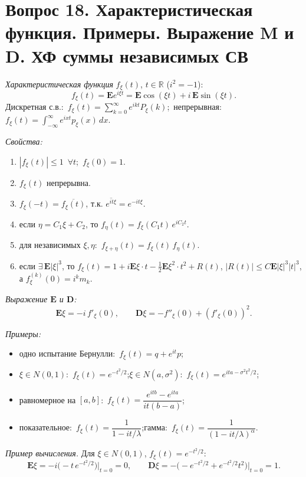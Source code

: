 \section*{Вопрос 18. Характеристическая функция. Примеры. Выражение M и D. ХФ суммы независимых СВ}

\textit{Характеристическая функция} $f_\xi(t)$, $t\in\mathbb{R}$ ($i^2=-1$):
\[ f_\xi(t)=\mathbf{E}e^{i\xi t}=\mathbf{E}\cos(\xi t)+i\,\mathbf{E}\sin(\xi t). \]
Дискретная с.в.:\ $f_\xi(t)=\sum_{k=0}^{\infty}e^{ikt}P_\xi(k)$;\ непрерывная:\ $f_\xi(t)=\int_{-\infty}^{\infty}e^{ixt}p_\xi(x)\,dx$.

\textit{Свойства:}
\begin{enumerate}
  \item $|f_\xi(t)|\le1$\ $\forall t$;\ $f_\xi(0)=1$.
  \item $f_\xi(t)$ непрерывна.
  \item $f_\xi(-t)=\overline{f_\xi(t)}$, т.к. $\overline{e^{it\xi}}=e^{-it\xi}$.
  \item если $\eta=C_1\xi+C_2$, то $f_\eta(t)=f_\xi(C_1 t)\,e^{iC_2 t}$.
  \item для независимых $\xi,\eta$:\ $f_{\xi+\eta}(t)=f_\xi(t)\,f_\eta(t)$.
  \item если $\exists\,\mathbf{E}|\xi|^3$, то $f_\xi(t)=1+i\mathbf{E}\xi\cdot t-\tfrac12\mathbf{E}\xi^2\cdot t^2+R(t)$, $|R(t)|\le C\mathbf{E}|\xi|^3|t|^3$, а $f_\xi^{(k)}(0)=i^k m_k$.
\end{enumerate}

\textit{Выражение $\mathbf{E}$ и $\mathbf{D}$:}
\[ \mathbf{E}\xi=-i\,f'_\xi(0),\qquad \mathbf{D}\xi=-f''_\xi(0)+(f'_\xi(0))^2. \]

\textit{Примеры:}
\begin{itemize}
  \item одно испытание Бернулли:\ $f_\xi(t)=q+e^{it}p$;
  \item $\xi\in N(0,1)$:\ $f_\xi(t)=e^{-t^2/2}$;\quad $\xi\in N(a,\sigma^2)$:\ $f_\xi(t)=e^{ita-\sigma^2 t^2/2}$;
  \item равномерное на $[a,b]$:\ $f_\xi(t)=\dfrac{e^{itb}-e^{ita}}{it(b-a)}$;
  \item показательное:\ $f_\xi(t)=\dfrac{1}{1-it/\lambda}$;\quad гамма:\ $f_\xi(t)=\dfrac{1}{(1-it/\lambda)^\alpha}$.
\end{itemize}

\textit{Пример вычисления.} Для $\xi\in N(0,1)$, $f_\xi(t)=e^{-t^2/2}$:
\[ \mathbf{E}\xi=-i\big(-t\,e^{-t^2/2}\big)\big|_{t=0}=0,\qquad \mathbf{D}\xi=-\big(-e^{-t^2/2}+e^{-t^2/2}t^2\big)\big|_{t=0}=1. \]
